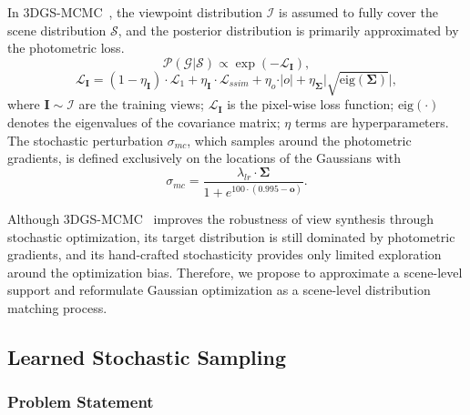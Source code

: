 \documentclass[lettersize,journal]{IEEEtran}
\begin{document}
In 3DGS-MCMC~\cite{mcmc}, the viewpoint distribution $\mathcal{I}$ is assumed to fully cover the scene distribution $\mathcal{S}$, and the posterior distribution is primarily approximated by the photometric loss. 
\begin{equation}
    \mathcal{P}(\mathcal{G} \vert \mathcal{S}) \propto \exp \left( - \mathcal{L}_{\mathbf{I}} \right), 
    \label{eq2}
\end{equation}
\begin{equation}
    \mathcal{L}_{\mathbf{I}} = \left( 1 - \eta_{\mathbf{I}} \right) \cdot \mathcal{L}_{1} + \eta_{\mathbf{I}} \cdot \mathcal{L}_{ssim} + \eta_{o} \cdot \vert o \vert + \eta_{\mathbf{\Sigma}} \vert \sqrt{\text{eig}(\mathbf{\Sigma})} \vert, 
    \label{eq3}
\end{equation}
where $\mathbf{I} \sim \mathcal{I}$ are the training views; $\mathcal{L}_{\mathbf{I}}$ is the pixel-wise loss function; $\text{eig}(\cdot)$ denotes the eigenvalues of the covariance matrix; $\eta$ terms are hyperparameters.
The stochastic perturbation $\sigma_{mc}$, which samples around the photometric gradients, is defined exclusively on the locations of the Gaussians with 
\begin{equation}
    \sigma_{mc} = \frac{\lambda_{lr} \cdot \mathbf{\Sigma}}{1 + e^{100 \cdot \left( 0.995 - \mathbf{o} \right)}}.
    \label{eq4}
\end{equation}

Although 3DGS-MCMC~\cite{mcmc} improves the robustness of view synthesis through stochastic optimization, its target distribution is still dominated by photometric gradients, and its hand-crafted stochasticity provides only limited exploration around the optimization bias. 
Therefore, we propose to approximate a scene-level support and reformulate Gaussian optimization as a scene-level distribution matching process. 

\subsection{Learned Stochastic Sampling}

\subsubsection{Problem Statement}
\end{document}

